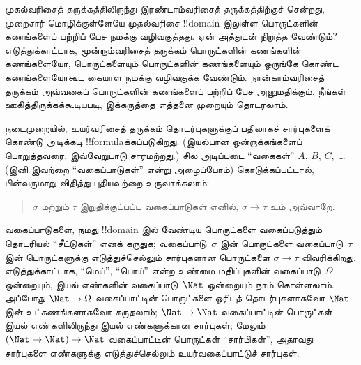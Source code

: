 \documentclass[../../../include/open-logic-section]{subfiles}
\begin{document}



முதல்வரிசைத் தருக்கத்திலிருந்து இரண்டாம்வரிசைத் தருக்கத்திற்குச் சென்றது,
முறைசார் மொழிக்குள்ளேயே முதல்வரிசை !!{domain} இலுள்ள பொருட்களின்
கணங்களைப் பற்றிப் பேச நமக்கு வழிவகுத்தது. ஏன் அத்துடன் நிறுத்த வேண்டும்?
எடுத்துக்காட்டாக, மூன்றாம்வரிசைத் தருக்கம் பொருட்களின் கணங்களின்
கணங்களையோ, பொருட்களையும் பொருட்களின் கணங்களையும் ஒருங்கே கொண்ட
கணங்களையோகூட கையாள நமக்கு வழிவகுக்க வேண்டும். நான்காம்வரிசைத் தருக்கம்
அவ்வகைப் பொருட்களின் கணங்களைப் பற்றிப் பேச அனுமதிக்கும். நீங்கள்
ஊகித்திருக்கக்கூடியபடி, இக்கருத்தை எத்தனை முறையும் தொடரலாம்.

நடைமுறையில், உயர்வரிசைத் தருக்கம் தொடர்புகளுக்குப் பதிலாகச் சார்புகளைக்
கொண்டு அடிக்கடி !!{formula}க்கப்படுகிறது. (இயல்பான ஒன்றாக்கங்களைப்
பொறுத்தவரை, இவ்வேறுபாடு சாரமற்றது.) சில அடிப்படை ``வகைகள்'' $A$, $B$,
$C$,~\dots (இனி இவற்றை ``வகைப்பாடுகள்'' என்று அழைப்போம்) கொடுக்கப்பட்டால்,
பின்வருமாறு விதித்து புதியவற்றை உருவாக்கலாம்:
\begin{quote}
$\sigma$ மற்றும் $\tau$ இறுதிக்குட்பட்ட வகைப்பாடுகள் எனில்,
$\sigma \to \tau$ உம் அவ்வாறே.
\end{quote}
வகைப்பாடுகளை, நமது !!{domain} இல் வேண்டிய பொருட்களை வகைப்படுத்தும்
தொடரியல் ``சீட்டுகள்'' எனக் கருதுக; வகைப்பாடு~$\sigma$ இன்
பொருட்களை வகைப்பாடு~$\tau$ இன் பொருட்களுக்கு எடுத்துச்செல்லும்
சார்புகளான பொருட்களை $\sigma \to \tau$ விவரிக்கிறது. எடுத்துக்காட்டாக,
``மெய்'', ``பொய்'' என்ற உண்மை மதிப்புகளின் வகைப்பாடு~$\Omega$ ஒன்றையும்,
இயல் எண்களின் வகைப்பாடு~$\Nat$ ஒன்றையும் நாம் கொள்ளலாம். அப்போது
$\Nat \to \Omega$ வகைப்பாட்டின் பொருட்களை ஓரிடத் தொடர்புகளாகவோ
$\Nat$ இன் உட்கணங்களாகவோ கருதலாம்; $\Nat \to \Nat$ வகைப்பாட்டின்
பொருட்கள் இயல் எண்களிலிருந்து இயல் எண்களுக்கான சார்புகள்; மேலும்
$(\Nat \to \Nat) \to \Nat$ வகைப்பாட்டின் பொருட்கள் ``சார்பிகள்'',
அதாவது சார்புகளை எண்களுக்கு எடுத்துச்செல்லும் உயர்வகைப்பாட்டுச் சார்புகள்.
\end{document}
